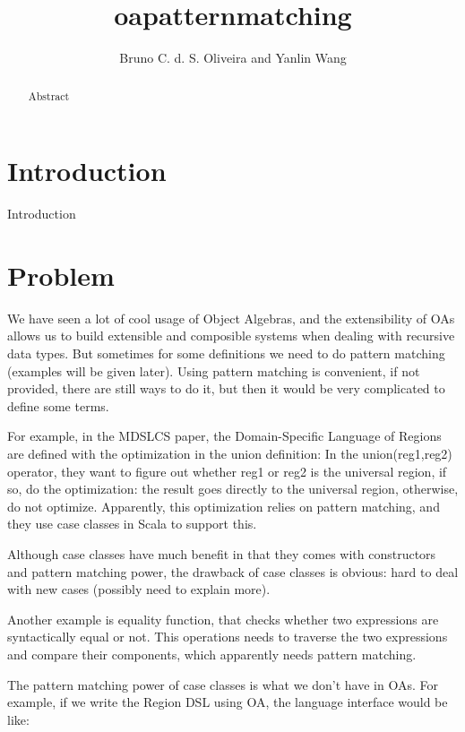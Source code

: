 \documentclass[preprint]{llncs}
\author{Bruno C. d. S. Oliveira and Yanlin Wang}
\institute{The University of Hong Kong\\
\email{\{bruno,ylwang\}@cs.hku.hk}\\
\authorrunning{Bruno Oliveira and Yanlin Wang}} %
\begin{document}
\title{oapatternmatching}

\maketitle

\begin{abstract}
Abstract
\end{abstract}

\section{Introduction}\label{sec:intro}
Introduction

\section{Problem}\label{sec:ep}
We have seen a lot of cool usage of Object Algebras\cite{}, and the
extensibility of OAs allows us to build extensible and composible
systems when dealing with recursive data types. But sometimes for some
definitions we need to do pattern matching (examples will be given
later). Using pattern matching is convenient, if not provided, there
are still ways to do it\cite{}, but then it would be very complicated
to define some terms.

For example, in the MDSLCS paper\cite{Hofer:2010:MDL:1868294.1868307},
the Domain-Specific Language of Regions are defined with the
optimization in the union definition: In the union(reg1,reg2)
operator, they want to figure out whether reg1 or reg2 is the
universal region, if so, do the optimization: the result goes directly
to the universal region, otherwise, do not optimize. Apparently, this
optimization relies on pattern matching, and they use case classes in
Scala to support this.

Although case classes have much benefit in that they comes with
constructors and pattern matching power, the drawback of case classes
is obvious: hard to deal with new cases (possibly need to explain
more). 

Another example is equality function, that checks whether two
expressions are syntactically equal or not. This operations needs to
traverse the two expressions and compare their components, which
apparently needs pattern matching. 

The pattern matching power of case classes is what we don't have in
OAs. For example, if we write the Region DSL using OA, the language
interface would be like:
\end{document}
